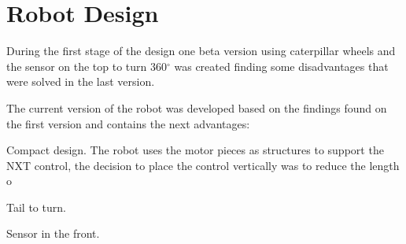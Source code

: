 \section{Robot Design}

During the first stage of the design one beta version using caterpillar wheels and the sensor on the top to turn 360$^\circ$ was created finding some disadvantages that were solved in the last version.

The current version of the robot was developed based on the findings found on the first version and contains the next advantages:

Compact design. The robot uses the motor pieces as structures to support the NXT control, the decision to place the control vertically was to reduce the length o

Tail to turn.

Sensor in the front.